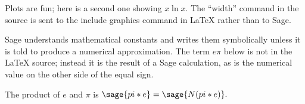\documentclass[11pt, oneside]{amsart}
\begin{document}
Plots are fun; here is a second one showing $x \ln x$. The ``width'' command in the source is sent to the include graphics command in LaTeX rather than to Sage.

\begin{center}
\end{center}

Sage understands mathematical constants and writes them symbolically unless it is told to produce a numerical approximation. The term $e \pi$ below is not in the LaTeX source; instead it is the result of a Sage calculation, as is the numerical value on the other side of the equal sign.

The product of $e$ and $\pi$ is $\sage{pi * e} = \sage{N(pi * e)}.$
\end{document}
